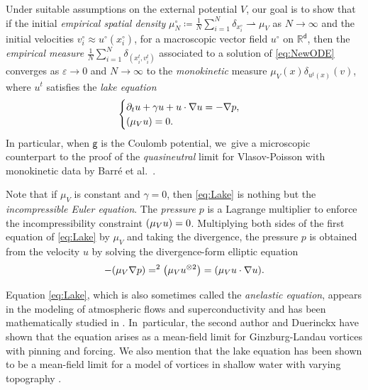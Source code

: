 \documentclass[JEP,XML,SOM,Unicode,published]{cedram}
\theoremstyle{plain}
\theoremstyle{definition}
\DeclarePairedDelimiter{\pa}{\lparen}{\rparen}
\let\div\relax
\DeclareMathOperator{\div}{\mathrm{div}}
\newcommand{\R}{{\mathbb{R}}}
\let\ga\gamma
\let\vep\varepsilon
\let\p\partial
\renewcommand{\d}{\mathsf{d}}
\newcommand{\g}{{\mathsf{g}}}
\begin{document}
Under suitable assumptions on the external potential $V$, our goal is to show that if the initial \emph{empirical spatial density} $\mu_N^\circ \coloneqq \frac1N\sum_{i=1}^N \delta_{x_i^\circ} \rightharpoonup \mu_V$ as $N\to\infty$ and the initial velocities $v_i^\circ \approx u^\circ(x_i^\circ)$, for a macroscopic vector field $u^\circ$ on $\R^\d$, then the \emph{empirical measure} $\frac{1}{N}\sum_{i=1}^N \delta_{(x_i^t,v_i^t)}$ associated to a solution of \eqref{eq:NewODE} converges as $\vep\to 0$ and $N\to\infty$ to the \emph{monokinetic} measure $\mu_V(x)\delta_{u^t(x)}(v)$, where $u^t$ satisfies the \emph{lake equation}
\begin{equation}\label{eq:Lake}
\begin{cases}
\p_t u +\ga u+ u \cdot\nabla u = -\nabla p,\\
\div(\mu_V u) = 0.
\end{cases}
\end{equation}
In particular, when $\g$ is the Coulomb potential, we~give a microscopic counterpart to the proof of the \emph{quasineutral} limit for Vlasov-Poisson with monokinetic data by Barré et al.\ \cite{BCGM2015}.

Note that if $\mu_V$ is constant and $\ga=0$, then \eqref{eq:Lake} is nothing but the \emph{incompressible Euler equation}. The \emph{pressure} $p$ is a Lagrange multiplier to enforce the incompressibility constraint $\div(\mu_V u)=0$. Multiplying both sides of the first equation of \eqref{eq:Lake} by $\mu_V$ and taking the divergence, the pressure $p$ is obtained from the velocity $u$ by solving the divergence-form elliptic equation
\begin{equation}\label{eq:press}
-\div\pa*{\mu_V\nabla p} = \div^{2}\pa*{\mu_V u^{\otimes 2}}= \div\pa*{\mu_V u\cdot\nabla u}.
\end{equation}

Equation \eqref{eq:Lake}, which is also sometimes called the \emph{anelastic equation}, appears in the modeling of atmospheric flows \cite{OP1962, Masmoudi2007} and superconductivity \cite{CR1997, DS2018, Duerinckx2018} and has been mathematically studied in \cite{LOT1996, LOT1996phy, BCGM2015, Duerinckx2018}. In~particular, the second author and Duerinckx \cite{DS2018} have shown that the equation arises as a mean-field limit for Ginzburg-Landau vortices with pinning and forcing. {We also mention that the lake equation has been shown \cite{Menard2023lake} to be a mean-field limit for a model of vortices in shallow water with varying topography \cite{Richardson2000}.}
\end{document}
